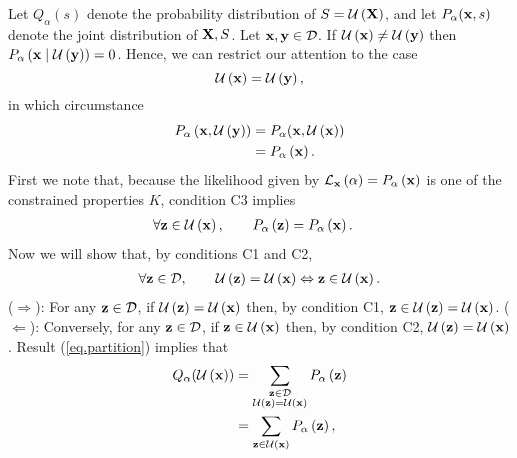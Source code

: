\documentclass[%
prx,
reprint,
superscriptaddress,
nofootinbib,
 amsmath,amssymb,
 aps,
]{revtex4-2}
\begin{document}
Let $Q_{\alpha} \left(s\right)$ denote the probability distribution of $S = \mathcal{U}\left({\bf X}\right)$, and let $P_{\alpha}({\bf x}, s)$ denote the joint distribution of ${\bf X}, S$. Let ${\bf x},{\bf y} \in \mathcal{D}$. If $\mathcal{U}\left({\bf x}\right) \neq \mathcal{U}\left({\bf y}\right)$ then $P_{\alpha}\left({\bf x} \mid \mathcal{U}\left({\bf y}\right)\right) = 0$. Hence, we can restrict our attention to the case
\begin{equation}\label{eq.joint}
\mathcal{U}\left({\bf x}\right) = \mathcal{U}\left({\bf y}\right),
\end{equation}%
in which circumstance
\begin{align}
P_{\alpha}\left( {\bf x}, \mathcal{U}\left({\bf y}\right) \right) &= P_{\alpha}({\bf x}, \mathcal{U}\left({\bf x}\right))\notag\\
&= P_{\alpha}\left({\bf x}\right).\label{eq.characteristic}
\end{align}%
First we note that, because the likelihood given by $\mathcal{L}_{{\bf x}}\left( \alpha \right) = P_{\alpha} \left( {\bf x}\right)$ is one of the constrained properties $K$, condition C3 implies
\begin{align}
\forall {\bf z} \in \mathcal{U}\left({\bf x}\right),\qquad P_{\alpha}\left( {\bf z} \right) &= P_{\alpha}\left( {\bf x} \right).\label{eq.prob}
\end{align}%
Now we will show that, by conditions C1 and C2,
\begin{align}\label{eq.partition}
\forall {\bf z} \in \mathcal{D},\qquad \mathcal{U}\left({\bf z}\right) = \mathcal{U}\left({\bf x}\right) \Leftrightarrow {\bf z} \in \mathcal{U}\left({\bf x}\right).
\end{align}%
($\Rightarrow$): For any ${\bf z} \in \mathcal{D}$, if $\mathcal{U}\left({\bf z}\right) = \mathcal{U}\left({\bf x}\right)$ then, by condition C1, ${\bf z} \in \mathcal{U}\left({\bf z}\right) = \mathcal{U}\left({\bf x}\right)$. ($\Leftarrow$): Conversely, for any ${\bf z} \in \mathcal{D}$, if ${\bf z} \in \mathcal{U}\left({\bf x}\right)$ then, by condition C2, $\mathcal{U}\left({\bf z}\right) = \mathcal{U}\left({\bf x}\right)$. Result (\ref{eq.partition}) implies that
\begin{align}
Q_{\alpha}(\mathcal{U}\left({\bf x}\right)) &= \sum_{\substack{{\bf z} \in \mathcal{D}\\ \mathcal{U}\left({\bf z}\right) = \mathcal{U}\left({\bf x}\right)}} P_{\alpha}\left({\bf z}\right)\notag\\
&= \sum_{{\bf z} \in \mathcal{U}\left({\bf x}\right)} P_{\alpha}\left({\bf z}\right),\notag
\end{align}%
\end{document}
